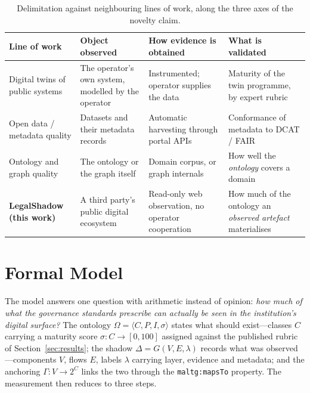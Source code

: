 \documentclass[engproc,proceedingpaper,submit,moreauthors]{Definitions/mdpi}
\begin{document}
\begin{table}[H]
\small
\caption{Delimitation against neighbouring lines of work, along the three axes of the novelty claim.\label{tab:related}}
\begin{tabularx}{\textwidth}{p{2.9cm}XXX}
\toprule
\textbf{Line of work} & \textbf{Object observed} & \textbf{How evidence is obtained} & \textbf{What is validated}\\
\midrule
Digital twins of public systems \cite{Haraguchi2024,DiazSarachaga2025,Anshari2022}
 & The operator's own system, modelled by the operator
 & Instrumented; operator supplies the data
 & Maturity of the twin programme, by expert rubric\\[2pt]
Open data / metadata quality \cite{Neumaier2016,Kubler2018,Vetro2016}
 & Datasets and their metadata records
 & Automatic harvesting through portal APIs
 & Conformance of metadata to DCAT / FAIR\\[2pt]
Ontology and graph quality \cite{Zaitoun2023,AbadNavarro2025,Seo2022}
 & The ontology or the graph itself
 & Domain corpus, or graph internals
 & How well the \emph{ontology} covers a domain\\[2pt]
\textbf{LegalShadow (this work)}
 & A third party's public digital ecosystem
 & Read-only web observation, no operator cooperation
 & How much of the ontology an \emph{observed artefact} materialises\\
\bottomrule
\end{tabularx}
\end{table}

\section{Formal Model}
\label{sec:formal}
    The model answers one question with arithmetic instead of opinion: \emph{how much of what the governance standards prescribe can actually be seen in the institution's digital surface?} The ontology $\Omega=\langle C,P,I,\sigma\rangle$ states what should exist---classes $C$ carrying a maturity score $\sigma:C\to[0,100]$ assigned against the published rubric of Section~\ref{sec:results}; the shadow $\Delta=G(V,E,\lambda)$ records what was observed---components $V$, flows $E$, labels $\lambda$ carrying layer, evidence and metadata; and the anchoring $\Gamma:V\to 2^{C}$ links the two through the \texttt{maltg:mapsTo} property. The measurement then reduces to three steps.
\end{document}
